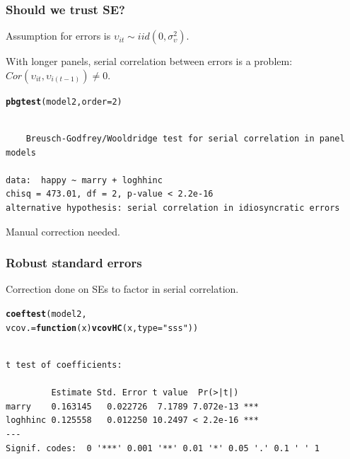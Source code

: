 \documentclass[10pt,english,dvipsnames,aspectratio=169,handout]{beamer}\usepackage[]{graphicx}\usepackage[]{xcolor}
\makeatletter
\newcommand{\hlnum}[1]{\textcolor[rgb]{0.686,0.059,0.569}{#1}}%
\newcommand{\hlstr}[1]{\textcolor[rgb]{0.192,0.494,0.8}{#1}}%
\newcommand{\hlstd}[1]{\textcolor[rgb]{0.345,0.345,0.345}{#1}}%
\newcommand{\hlkwa}[1]{\textcolor[rgb]{0.161,0.373,0.58}{\textbf{#1}}}%
\newcommand{\hlkwc}[1]{\textcolor[rgb]{0.333,0.667,0.333}{#1}}%
\newcommand{\hlkwd}[1]{\textcolor[rgb]{0.737,0.353,0.396}{\textbf{#1}}}%
\newenvironment{kframe}{%
 \def\at@end@of@kframe{}%
 \ifinner\ifhmode%
  \def\at@end@of@kframe{\end{minipage}}%
  \begin{minipage}{\columnwidth}%
 \fi\fi%
 \def\FrameCommand##1{\hskip\@totalleftmargin \hskip-\fboxsep
 \colorbox{shadecolor}{##1}\hskip-\fboxsep
     \hskip-\linewidth \hskip-\@totalleftmargin \hskip\columnwidth}%
 \MakeFramed {\advance\hsize-\width
   \@totalleftmargin\z@ \linewidth\hsize
   \@setminipage}}%
 {\par\unskip\endMakeFramed%
 \at@end@of@kframe}
\newenvironment{knitrout}{}{} %
\makeatother
\begin{document}
\begin{frame}[fragile]
  \frametitle{Should we trust SE?}
  Assumption for errors is $\upsilon_{it} \sim iid(0, \sigma_{\upsilon}^2)$.\bigskip
  
  With longer panels, serial correlation between errors is a problem: $Cor(\upsilon_{it}, \upsilon_{i(t-1)}) \neq 0$.\bigskip
  \pause
  
\begin{knitrout}\scriptsize
{}\color{fgcolor}\begin{kframe}
\begin{alltt}
\hlkwd{pbgtest}\hlstd{(model2,} \hlkwc{order} \hlstd{=} \hlnum{2}\hlstd{)}
\end{alltt}
\begin{verbatim}

	Breusch-Godfrey/Wooldridge test for serial correlation in panel models

data:  happy ~ marry + loghhinc
chisq = 473.01, df = 2, p-value < 2.2e-16
alternative hypothesis: serial correlation in idiosyncratic errors
\end{verbatim}
\end{kframe}
\end{knitrout}
  
  Manual correction needed.
\end{frame}



\begin{frame}[fragile]
  \frametitle{Robust standard errors}
  Correction done on SEs to factor in serial correlation.
  
\begin{knitrout}\scriptsize
{}\color{fgcolor}\begin{kframe}
\begin{alltt}
\hlkwd{coeftest}\hlstd{(model2,}
         \hlkwc{vcov.} \hlstd{=} \hlkwa{function}\hlstd{(}\hlkwc{x}\hlstd{)} \hlkwd{vcovHC}\hlstd{(x,} \hlkwc{type} \hlstd{=} \hlstr{"sss"}\hlstd{))}
\end{alltt}
\begin{verbatim}

t test of coefficients:

         Estimate Std. Error t value  Pr(>|t|)    
marry    0.163145   0.022726  7.1789 7.072e-13 ***
loghhinc 0.125558   0.012250 10.2497 < 2.2e-16 ***
---
Signif. codes:  0 '***' 0.001 '**' 0.01 '*' 0.05 '.' 0.1 ' ' 1
\end{verbatim}
\end{kframe}
\end{knitrout}
  
\end{frame}
\end{document}
